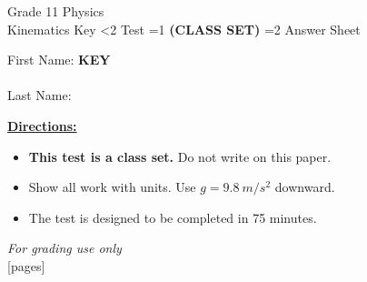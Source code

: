 \documentclass[addpoints]{exam}
\newcommand{\event}{Kinematics}
\newcommand{\tournament}{}
\def\type{0}
\begin{document}
\begin{center}
    {\huge Grade 11 Physics \\ \event
    \ifprintanswers \space Key
    \else \space \ifnum\type<2 Test \fi \ifnum\type=1 \textbf{(CLASS SET)} \fi
          \ifnum\type=2 Answer Sheet \fi
    \fi \\ \vspace{3mm}\tournament\vspace{1mm}}
\end{center}

\vspace{.25\textheight}

\begin{center}
    First Name: \ifprintanswers
    \underline{\hspace{3.5cm}}\textbf{KEY}\underline{\hspace{5.5cm}}\\\vspace{5mm}
    \else \underline{\hspace{10cm}}\\ \vspace{5mm} \fi
    Last Name: \underline{\hspace{10cm}}\\ \vspace{5mm}
\end{center}

\noindent\textbf{\underline{Directions:}}
\begin{itemize}
    \ifnum\type=1 \item \textbf{This test is a class set.} Do not write on this paper. \fi
    \item Show all work with units. Use $g = \SI{9.8}{m/s^2}$ downward.
    \item The test is designed to be completed in 75 minutes.
\end{itemize}
\begin{center}
\textit{For grading use only}\\
[pages]
\end{center}
\end{document}
